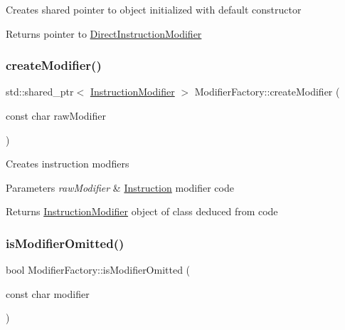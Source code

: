 Creates shared pointer to object initialized with default constructor \begin{DoxyReturn}{Returns}
pointer to \hyperlink{classDirectInstructionModifier}{Direct\+Instruction\+Modifier} 
\end{DoxyReturn}
\mbox{\label{classModifierFactory_a2c5bcf63ebfe5acd617783ffb6468ec7}} 
\subsubsection{\texorpdfstring{create\+Modifier()}{createModifier()}}
{\footnotesize\ttfamily std\+::shared\+\_\+ptr$<$ \hyperlink{classInstructionModifier}{Instruction\+Modifier} $>$ Modifier\+Factory\+::create\+Modifier (\begin{DoxyParamCaption}\item[{const char}]{raw\+Modifier }\end{DoxyParamCaption})\hspace{0.3cm}{\ttfamily [static]}}

Creates instruction modfiers 
\begin{DoxyParams}{Parameters}
{\em raw\+Modifier} & \hyperlink{classInstruction}{Instruction} modifier code \\
\hline
\end{DoxyParams}
\begin{DoxyReturn}{Returns}
\hyperlink{classInstructionModifier}{Instruction\+Modifier} object of class deduced from code 
\end{DoxyReturn}
\mbox{\label{classModifierFactory_a44341cfff086fc453d24fe5d01c8bfa6}} 
\subsubsection{\texorpdfstring{is\+Modifier\+Omitted()}{isModifierOmitted()}}
{\footnotesize\ttfamily bool Modifier\+Factory\+::is\+Modifier\+Omitted (\begin{DoxyParamCaption}\item[{const char}]{modifier }\end{DoxyParamCaption})\hspace{0.3cm}{\ttfamily [static]}}


